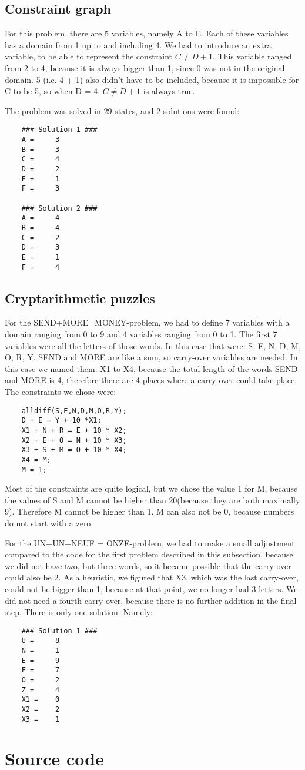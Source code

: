\documentclass{article}
\begin{document}
	\subsection*{Constraint graph}
	
	For this problem, there are 5 variables, namely A to E. Each of these variables has a domain from 1 up to and including 4. We had to introduce an extra variable, to be able to represent the constraint $ C \neq D + 1 $. This variable ranged from 2 to 4, because it is always bigger than 1, since 0 was not in the original domain. 5 (i.e. 4 + 1) also didn't have to be included, because it is impossible for C to be 5, so when D = 4, $ C \neq D + 1 $ is always true.
	
	The problem was solved in 29 states, and 2 solutions were found: 
	\begin{lstlisting}
	### Solution 1 ###
	A = 	3 
	B = 	3 
	C = 	4 
	D = 	2 
	E = 	1 
	F = 	3 

	### Solution 2 ###
	A = 	4 
	B = 	4 
	C = 	2 
	D = 	3 
	E = 	1 
	F = 	4 
\end{lstlisting}


	\subsection*{Cryptarithmetic puzzles}
	
	For the SEND+MORE=MONEY-problem, we had to define 7 variables with a domain ranging from 0 to 9 and 4 variables ranging from 0 to 1. The first 7 variables were all the letters of those words. In this case that were: S, E, N, D, M, O, R, Y. SEND and MORE are like a sum, so carry-over variables are needed. In this case we named them: X1 to X4, because the total length of the words SEND and MORE is 4, therefore there are 4 places where a carry-over could take place. The constraints we chose were: 
	\begin{lstlisting}
	alldiff(S,E,N,D,M,O,R,Y);
	D + E = Y + 10 *X1;
	X1 + N + R = E + 10 * X2;
	X2 + E + O = N + 10 * X3;
	X3 + S + M = O + 10 * X4;
	X4 = M;
	M = 1;
	\end{lstlisting}
Most of the constraints are quite logical, but we chose the value 1 for M, because the values of S and M cannot be higher than 20(because they are both maximally 9). Therefore M cannot be higher than 1. M can also not be 0, because numbers do not start with a zero.
	
	For the UN+UN+NEUF = ONZE-problem, we had to make a small adjustment compared to the code for the first problem described in this subsection, because we did not have two, but three words, so it became possible that the carry-over could also be 2. As a heuristic, we figured that X3, which was the last carry-over, could not be bigger than 1, because at that point, we no longer had 3 letters. We did not need a fourth carry-over, because there is no further addition in the final step. There is only one solution. Namely:
	\begin{lstlisting}
	### Solution 1 ###
	U = 	8 
	N = 	1 
	E = 	9 
	F = 	7 
	O = 	2 
	Z = 	4 
	X1 = 	0 
	X2 = 	2 
	X3 = 	1 
	\end{lstlisting}
	\section{Source code}

	
	

		
\end{document}

